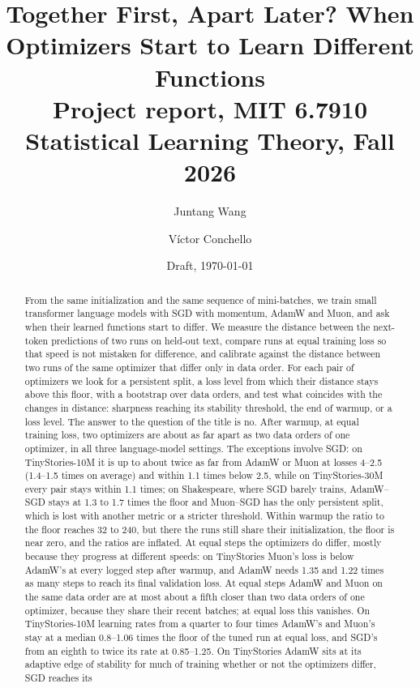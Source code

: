 \documentclass[10pt]{article}
\title{\vspace{-1.6em}Together First, Apart Later? When Optimizers Start to Learn Different Functions\\[2pt]
\large Project report, MIT 6.7910 Statistical Learning Theory, Fall 2026}
\author{Juntang Wang \and V\'ictor Conchello}
\date{Draft, \today}
\begin{document}
\maketitle
\vspace{-1.2em}

\begin{abstract}
\noindent
From the same initialization and the same sequence of mini-batches, we train small transformer language
models with SGD with momentum, AdamW and Muon, and ask when their learned functions start to differ. We
measure the distance between the next-token predictions of two runs on held-out text, compare runs at
equal training loss so that speed is not mistaken for difference, and calibrate against the distance
between two runs of the same optimizer that differ only in data order. For each pair of optimizers we look
for a persistent split, a loss level from which their distance stays above this floor, with a bootstrap
over data orders, and test what coincides with the changes in distance: sharpness reaching its stability
threshold, the end of warmup, or a loss level. The answer to the question of the title is no. After warmup, at
equal training loss, two optimizers are about as far apart as two data orders of one optimizer, in all three
language-model settings. The exceptions involve SGD: on TinyStories-10M it is up to about twice as far from
AdamW or Muon at losses 4--2.5 (1.4--1.5 times on average) and within 1.1 times below 2.5, while on TinyStories-30M
every pair stays within 1.1 times; on Shakespeare, where SGD barely trains, AdamW--SGD stays at 1.3 to 1.7 times
the floor and Muon--SGD has the only persistent split, which is lost with another metric or a stricter
threshold. Within warmup the ratio to the floor reaches 32 to 240, but there the runs still share their
initialization, the floor is near zero, and the ratios are inflated. At equal steps the optimizers do differ,
mostly because they progress at different speeds: on TinyStories Muon's loss is below AdamW's at every logged
step after warmup, and AdamW needs 1.35 and 1.22 times as many steps to reach its final validation loss. At equal
steps AdamW and Muon on the same data order are at most about a fifth closer than two data orders of one
optimizer, because they share their recent batches; at equal loss this vanishes. On TinyStories-10M learning rates from a quarter to
four times AdamW's and Muon's stay at a median 0.8--1.06 times the floor of the tuned run at equal loss, and
SGD's from an eighth to twice its rate at 0.85--1.25. On TinyStories AdamW sits at
its adaptive edge of stability for much of training whether or not the optimizers differ, SGD reaches its

\end{abstract}
\end{document}
